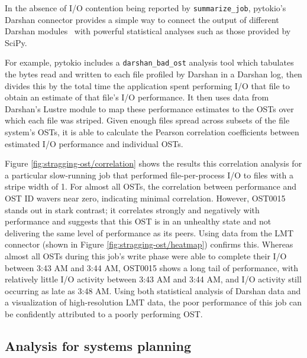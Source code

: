 In the absence of I/O contention being reported by \texttt{summarize\_job}, pytokio's Darshan connector provides a simple way to connect the output of different Darshan modules~\cite{Snyder2016modular} with powerful statistical analyses such as those provided by SciPy.

For example, pytokio includes a \texttt{darshan\_bad\_ost} analysis tool which tabulates the bytes read and written to each file profiled by Darshan in a Darshan log, then divides this by the total time the application spent performing I/O that file to obtain an estimate of that file's I/O performance.
It then uses data from Darshan's Lustre module to map these performance estimates to the OSTs over which each file was striped.
Given enough files spread across subsets of the file system's OSTs, it is able to calculate the Pearson correlation coefficients between estimated I/O performance and individual OSTs.

Figure \ref{fig:stragging-ost/correlation} shows the results this correlation analysis for a particular slow-running job that performed file-per-process I/O to files with a stripe width of 1.
For almost all OSTs, the correlation between performance and OST ID wavers near zero, indicating minimal correlation.
However, OST0015 stands out in stark contrast; it correlates strongly and negatively with performance and suggests that this OST is in an unhealthy state and not delivering the same level of performance as its peers.
Using data from the LMT connector (shown in Figure \ref{fig:stragging-ost/heatmap}) confirms this.
Whereas almost all OSTs during this job's write phase were able to complete their I/O between 3:43 AM and 3:44 AM, OST0015 shows a long tail of performance, with relatively little I/O activity between 3:43 AM and 3:44 AM, and I/O activity still occurring as late as 3:48 AM.
Using both statistical analysis of Darshan data and a visualization of high-resolution LMT data, the poor performance of this job can be confidently attributed to a poorly performing OST.


\subsection{Analysis for systems planning} \label{sec:results/planning}


